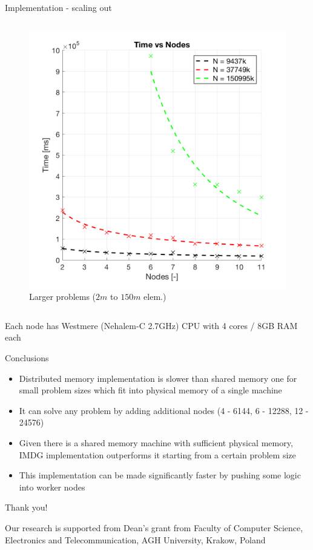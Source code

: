 \documentclass[c]{beamer}
\begin{document}
\begin{frame}{Implementation - scaling out}
\begin{columns}
  \begin{column}{0.5\textwidth}
    \begin{figure}
      \centering
      \includegraphics[width=1\textwidth]{img/TotalTimeVsNodeCount_BIG.png}
      \caption{\tiny Larger problems ($2m$ to $150m$ elem.)}
    \end{figure}
  \end{column}
\end{columns}
    
    {\tiny * Each node has Westmere (Nehalem-C 2.7GHz) CPU with 4 cores / 8GB RAM each}

\end{frame}


\begin{frame}{Conclusions}

\begin{itemize}
  \item Distributed memory implementation is slower than shared memory one for small problem sizes which fit into physical memory of a single machine
  \item It can solve any problem by adding additional nodes (4 - 6144, 6 - 12288, 12 - 24576)
  \item Given there is a shared memory machine with sufficient physical memory, IMDG implementation outperforms it starting from a certain problem size
  \item This implementation can be made significantly faster by pushing some logic into worker nodes
\end{itemize}

\end{frame}

\begin{frame}{Thank you!}


Our research is supported from Dean's grant from Faculty of Computer Science, Electronics and Telecommunication, AGH University, Krakow, Poland

\end{frame}

\end{document}
